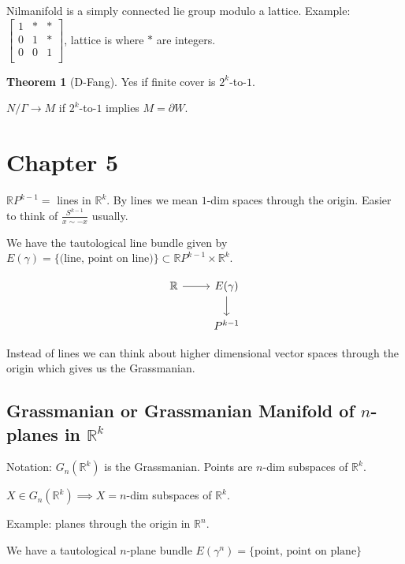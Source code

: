 \documentclass{article}
\theoremstyle{definition}
\newtheorem{theorem}{Theorem}
\begin{document}
    Nilmanifold is a simply connected lie group modulo a lattice. Example: \(\begin{bmatrix}
        1 & \ast & \ast  \\
        0 & 1 & \ast  \\
        0 & 0 & 1 \\
    \end{bmatrix} \), lattice is where \(\ast\) are integers.

    \begin{theorem}
        [D-Fang] Yes if finite cover is \(2^k\)-to-\(1\).

        \(N / \Gamma \to M\) if \(2^k\)-to-\(1\) implies \(M = \partial W\). 
    \end{theorem}

    \section*{Chapter 5}

    \(\mathbb{R} P^{k-1} =\) lines in \(\mathbb{R}^k\). By lines we mean \(1\)-dim spaces through the origin. Easier to think of \(\frac{S^{k-1}}{x \sim -x}\) usually.

    We have the tautological line bundle given by \(E(\gamma) = \{ \text{(line, point on line)} \} \subset \mathbb{R}P^{k-1} \times \mathbb{R}^k\).

    \[
        \begin{tikzcd}
            \mathbb{R} \ar[r] & E(\gamma)\ar[d] \\ & P^{k-1}
        \end{tikzcd}
    \]

    Instead of lines we can think about higher dimensional vector spaces through the origin which gives us the Grassmanian.

    \subsection*{Grassmanian or Grassmanian Manifold of \(n\)-planes in \(\mathbb{R}^k\)}

    Notation: \(G_n(\mathbb{R}^k)\) is the Grassmanian. Points are \(n\)-dim subspaces of \(\mathbb{R}^k\).

    \(X\in G_n(\mathbb{R}^k) \implies X = n\)-dim subspaces of \(\mathbb{R}^k\).

    Example: planes through the origin in \(\mathbb{R}^n\).

    We have a tautological \(n\)-plane bundle \(E(\gamma^n) = \{ \text{point, point on plane} \} \) 
\end{document}
